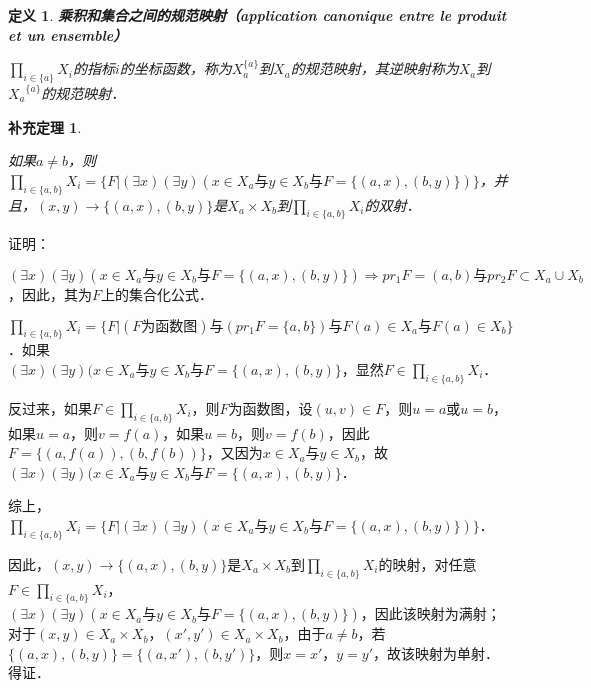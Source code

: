 \documentclass[12pt, a4paper, oneside]{book}
\newtheorem{cor}{补充定理}
\newtheorem{de}{定义}
\begin{document}
			\begin{de}
				\textbf{乘积和集合之间的规范映射（application canonique entre le produit et un ensemble）}
				\par
				$\prod\limits_{i\in \{a\}}X_i$的指标$i$的坐标函数，称为$X_a^{\{a\}}$到$X_a$的规范映射，其逆映射称为$X_a$到${X_a}^{\{a\}}$的规范映射．
			\end{de}
			
			\begin{cor}\label{cor131}
				\hfill\par
				如果$a\neq b$，则$\prod\limits_{i\in \{a, b\}}X_i=\{F|(\exists x)(\exists y)(x\in X_a\text{与}y\in X_b\text{与}F=\{(a, x), (b, y)\})\}$，并且，$(x, y)\to \{(a, x), (b, y)\}$是$X_a\times X_b$到$\prod\limits_{i\in \{a, b\}}X_i$的双射．
			\end{cor}
			证明：
			\par
			$(\exists x)(\exists y)(x\in X_a\text{与}y\in X_b\text{与}F=\{(a, x), (b, y)\})\Rightarrow pr_1F=(a, b)\text{与}pr_2F\subset X_a\cup X_b$，因此，其为$F$上的集合化公式．
			\par
			$\prod\limits_{i\in \{a, b\}}X_i=\{F|(F\text{为函数图})\text{与}(pr_1F=\{a, b\})\text{与}F(a)\in X_a\text{与}F(a)\in X_b\}$．如果\\$(\exists x)(\exists y)(x\in X_a\text{与}y\in X_b\text{与}F=\{(a, x), (b, y)\}$，显然$F\in \prod\limits_{i\in \{a, b\}}X_i$．
			\par
			反过来，如果$F\in \prod\limits_{i\in \{a, b\}}X_i$，则$F$为函数图，设$(u, v)\in F$，则$u=a\text{或}u=b$，如果$u=a$，则$v=f(a)$，如果$u=b$，则$v=f(b)$，因此$F=\{(a, f(a)), (b, f(b))\}$，又因为$x\in X_a\text{与}y\in X_b$，故$(\exists x)(\exists y)(x\in X_a\text{与}y\in X_b\text{与}F=\{(a, x), (b, y)\}$．
			\par
			综上，$\prod\limits_{i\in \{a, b\}}X_i=\{F|(\exists x)(\exists y)(x\in X_a\text{与}y\in X_b\text{与}F=\{(a, x), (b, y)\})\}$．
			\par
			因此，$(x, y)\to \{(a, x), (b, y)\}$是$X_a\times X_b$到$\prod\limits_{i\in \{a, b\}}X_i$的映射，对任意$F\in \prod\limits_{i\in \{a, b\}}X_i$，\\$(\exists x)(\exists y)(x\in X_a\text{与}y\in X_b\text{与}F=\{(a, x), (b, y)\})$，因此该映射为满射；对于$(x, y) \in X_a\times X_b$，$(x', y') \in X_a\times X_b$，由于$a\neq b$，若$\{(a, x), (b, y)\}=\{(a, x'), (b, y')\}$，则$x=x'$，$y=y'$，故该映射为单射．得证．
						
\end{document}
